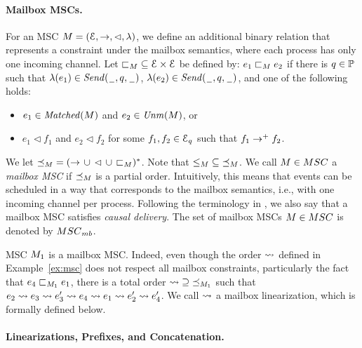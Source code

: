 \documentclass[a4paper,UKenglish,cleveref, autoref, thm-restate]{lipics-v2021}
\begin{document}
\paragraph*{Mailbox MSCs.}

For an MSC $M = (\mathcal{E},\to,\lhd,\lambda)$, we define
an additional binary relation that represents a constraint
under the mailbox semantics, where each process has only one incoming channel.
Let ${\sqsubset}_M \subseteq \mathcal{E} \times \mathcal{E}$
be defined by: $e_1 \sqsubset_M e_2$ if there is $q \in \mathbb{P}$
such that $\lambda(e_1) \in {\mathit{Send}(\hspace{0.1em}\underline{\hspace{0.5em}}\hspace{0.1em},q,\hspace{0.1em}\underline{\hspace{0.5em}}\hspace{0.1em})}$,
$\lambda(e_2) \in {\mathit{Send}(\hspace{0.1em}\underline{\hspace{0.5em}}\hspace{0.1em},q,\hspace{0.1em}\underline{\hspace{0.5em}}\hspace{0.1em})}$, and one of the following holds:
\begin{itemize}\itemsep=0.5ex
\item $e_1 \in \mathit{Matched}(M)$ and $e_2 \in \mathit{Unm}(M)$, or
\item $e_1 \lhd f_1$ and $e_2 \lhd f_2$ for some $f_1,f_2 \in \mathcal{E}_q$ such that $f_1 \to^+ f_2$.
\end{itemize}

We let ${\preceq_M} = ({\to} \,\cup\, {\lhd} \,\cup\, {\sqsubset_M})^\ast$.
Note that ${\le_M} \subseteq {\preceq_M}$.
%
We call $\msc \in \ppMSCs$ a \emph{mailbox MSC}
if ${\preceq_M}$ is a partial order.
Intuitively, this means that events can be scheduled in a way that corresponds
to the mailbox semantics, i.e., with one incoming channel per process.
Following the terminology in \cite{DBLP:conf/cav/BouajjaniEJQ18}, we also say that
a mailbox MSC satisfies \emph{causal delivery}.
The set of mailbox MSCs $\msc \in \ppMSCs$ is denoted by $\cdMSCs$.

\begin{example}\label{ex:mailbox-msc}
  MSC $M_{1}$ is a mailbox MSC. Indeed, even though the order $\rightsquigarrow$ defined in Example~\ref{ex:msc} does not respect all mailbox constraints, particularly the fact that $e_4 \sqsubset_{M_{1}} e_1$, there is a total order $ {\rightsquigarrow} \supseteq {\preceq_{M_{1}}}$ such that $
  e_2 \rightsquigarrow e_3 \rightsquigarrow e_3' \rightsquigarrow e_4 \rightsquigarrow e_1 \rightsquigarrow e_2' \rightsquigarrow e_4'$. We call $\rightsquigarrow$ a mailbox linearization, which is formally defined below.
\end{example}

\paragraph*{Linearizations, Prefixes, and Concatenation.}
\end{document}
